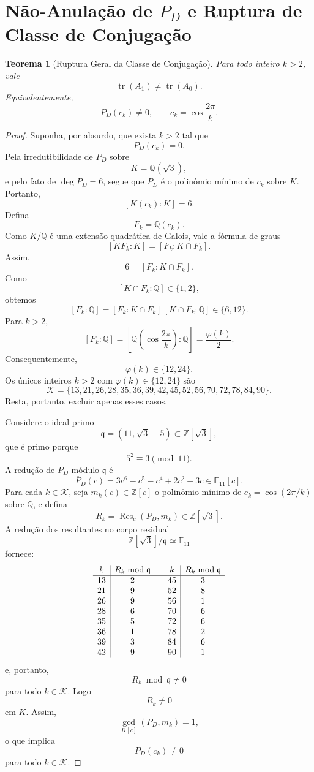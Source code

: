 \documentclass[11pt,a4paper]{article}
\newtheorem{teorema}{Teorema}
\begin{document}
\section{Não-Anulação de \texorpdfstring{$P_D$}{PD} e Ruptura de Classe de Conjugação}

\begin{teorema}[Ruptura Geral da Classe de Conjugação]
Para todo inteiro $k>2$, vale
\[
\operatorname{tr}(A_1)\neq\operatorname{tr}(A_0).
\]
Equivalentemente,
\[
P_D(c_k)\neq0,\qquad c_k=\cos\frac{2\pi}{k}.
\]
\end{teorema}

\begin{proof}
Suponha, por absurdo, que exista $k>2$ tal que
\[
P_D(c_k)=0.
\]
Pela irredutibilidade de $P_D$ sobre
\[
K=\mathbb{Q}(\sqrt{3}),
\]
e pelo fato de $\deg P_D=6$, segue que $P_D$ é o polinômio mínimo de $c_k$ sobre $K$. Portanto,
\[
[K(c_k):K]=6.
\]
Defina
\[
F_k=\mathbb{Q}(c_k).
\]
Como $K/\mathbb{Q}$ é uma extensão quadrática de Galois, vale a fórmula de graus
\[
[KF_k:K]=[F_k:K\cap F_k].
\]
Assim,
\[
6=[F_k:K\cap F_k].
\]
Como
\[
[K\cap F_k:\mathbb{Q}]\in\{1,2\},
\]
obtemos
\[
[F_k:\mathbb{Q}]=[F_k:K\cap F_k]\,[K\cap F_k:\mathbb{Q}]\in\{6,12\}.
\]
Para $k>2$,
\[
[F_k:\mathbb{Q}]=\left[\mathbb{Q}\!\left(\cos\frac{2\pi}{k}\right):\mathbb{Q}\right]=\frac{\varphi(k)}{2}.
\]
Consequentemente,
\[
\varphi(k)\in\{12,24\}.
\]
Os únicos inteiros $k>2$ com $\varphi(k)\in\{12,24\}$ são
\[
\mathcal{K}=\{13,21,26,28,35,36,39,42,45,52,56,70,72,78,84,90\}.
\]
Resta, portanto, excluir apenas esses casos.

Considere o ideal primo
\[
\mathfrak{q}=(11,\sqrt{3}-5)\subset\mathbb{Z}[\sqrt{3}],
\]
que é primo porque
\[
5^2\equiv3\pmod{11}.
\]
A redução de $P_D$ módulo $\mathfrak{q}$ é
\[
\overline{P}_D(c)=3c^6-c^5-c^4+2c^2+3c\in\mathbb{F}_{11}[c].
\]
Para cada $k\in\mathcal{K}$, seja $m_k(c)\in\mathbb{Z}[c]$ o polinômio mínimo de
$c_k=\cos(2\pi/k)$ sobre $\mathbb{Q}$, e defina
\[
R_k=\operatorname{Res}_c(P_D,m_k)\in\mathbb{Z}[\sqrt{3}].
\]
A redução dos resultantes no corpo residual
\[
\mathbb{Z}[\sqrt{3}]/\mathfrak{q}\simeq\mathbb{F}_{11}
\]
fornece:
\[
\begin{array}{c|c@{\qquad}c|c}
k&R_k\bmod\mathfrak{q}&k&R_k\bmod\mathfrak{q}\\
\hline
13&2&45&3\\
21&9&52&8\\
26&9&56&1\\
28&6&70&6\\
35&5&72&6\\
36&1&78&2\\
39&3&84&6\\
42&9&90&1
\end{array}
\]
e, portanto,
\[
R_k\bmod\mathfrak{q}\neq0
\]
para todo $k\in\mathcal{K}$.
Logo
\[
R_k\neq0
\]
em $K$. Assim,
\[
\gcd_{K[c]}(P_D,m_k)=1,
\]
o que implica
\[
P_D(c_k)\neq0
\]
para todo $k\in\mathcal{K}$.


\end{proof}
\end{document}
